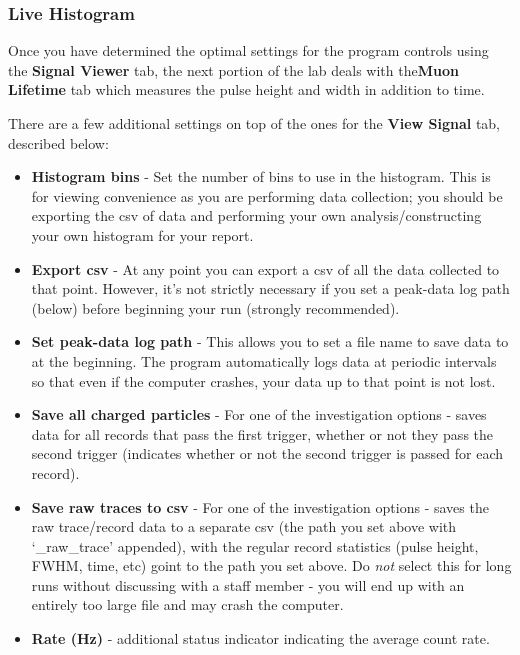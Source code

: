 \documentclass{../lab}
\begin{document}
\subsubsection{Live Histogram}

Once you have determined the optimal settings for the program controls using the \textbf{Signal Viewer} tab, the next portion of the lab deals with the\textbf{Muon Lifetime} tab which measures the pulse height and width in addition to time.

There are a few additional settings on top of the ones for the \textbf{View Signal} tab, described below:

\begin{itemize}
    \item \textbf{Histogram bins} - Set the number of bins to use in the histogram. This is for viewing convenience as you are performing data collection; you should be exporting the csv of data and performing your own analysis/constructing your own histogram for your report.
    \item \textbf{Export csv} - At any point you can export a csv of all the data collected to that point. However, it's not strictly necessary if you set a peak-data log path (below) before beginning your run (strongly recommended).
    \item \textbf{Set peak-data log path} - This allows you to set a file name to save data to at the beginning. The program automatically logs data at periodic intervals so that even if the computer crashes, your data up to that point is not lost.
    \item \textbf{Save all charged particles} - For one of the investigation options - saves data for all records that pass the first trigger, whether or not they pass the second trigger (indicates whether or not the second trigger is passed for each record).
    \item \textbf{Save raw traces to csv} - For one of the investigation options - saves the raw trace/record data to a separate csv (the path you set above with `\_raw\_trace' appended), with the regular record statistics (pulse height, FWHM, time, etc) goint to the path you set above. Do \textit{not} select this for long runs without discussing with a staff member - you will end up with an entirely too large file and may crash the computer.
    \item \textbf{Rate (Hz)} - additional status indicator indicating the average count rate.
\end{itemize}
\end{document}
